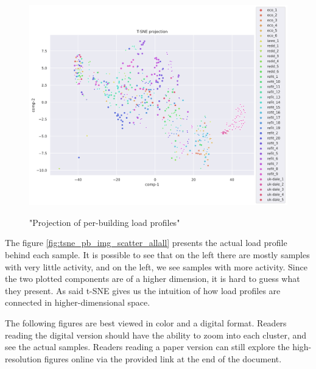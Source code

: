\begin{figure}[H]
	\centering
	\caption{"Projection of per-building load profiles"}
	\includegraphics[width=1.2\textwidth]{Figures/TSNE/TSNE_per_building/non_norm/scatter_non_norm_all.png}
	\label{fig:tsne_scatter_non_norm_all}
\end{figure}

The figure \ref{fig:tsne_pb_img_scatter_allall} presents the actual load profile behind each sample. 
It is possible to see that on the left there are mostly samples with very little activity,
and on the left, we see samples with more activity.
Since the two plotted components are of a higher dimension, it is hard to guess what they present.
As said t-SNE gives us the intuition of how load profiles are connected in higher-dimensional space.

The following figures are best viewed in color and a digital format. 
Readers reading the digital version should have the ability to zoom into each cluster, and see the actual samples. 
Readers reading a paper version can still explore the high-resolution figures online via the provided link at the end of the document.

